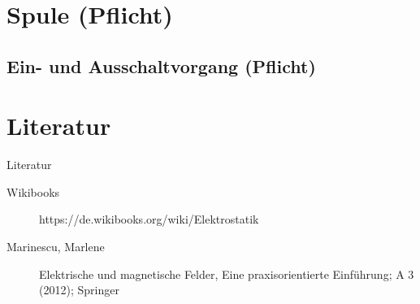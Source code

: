 \documentclass[aspectratio=169, ignorenonframetext]{beamer}
\begin{document}
\section[Spule]{Spule (Pflicht)}

\subsection{Ein- und Ausschaltvorgang (Pflicht)}


\section{Literatur}
\begin{frame}{Literatur}
\begin{description}
  \item[Wikibooks] https://de.wikibooks.org/wiki/Elektrostatik
  \item[Marinescu, Marlene]  Elektrische und magnetische Felder,
  Eine praxisorientierte Einführung; A 3 (2012); Springer
\end{description}
\end{frame}

  \listoffigures


  \label{LastPage}
\end{document}
